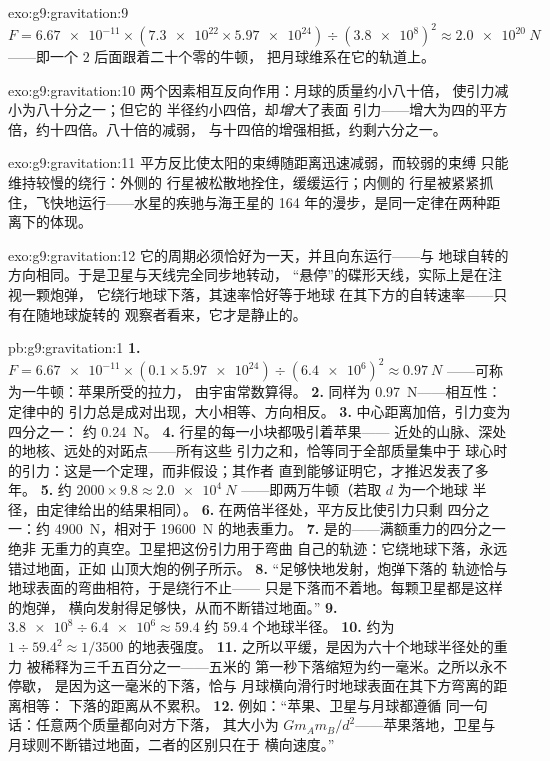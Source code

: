 \begin{solution}{exo:g9:gravitation:9}
$F = \num{6.67e-11} \times (\num{7.3e22} \times
\num{5.97e24}) \div (\num{3.8e8})^2 \approx \qty{2.0e20}{N}$
——即一个 $2$ 后面跟着二十个零的牛顿，
把月球维系在它的轨道上。
\end{solution}

\begin{solution}{exo:g9:gravitation:10}
两个因素相互反向作用：月球的质量约小八十倍，
使引力减小为八十分之一；但它的
半径约小四倍，却\emph{增大}了表面
引力——增大为四的平方倍，约十四倍。八十倍的减弱，
与十四倍的增强相抵，约剩六分之一。
\end{solution}

\begin{solution}{exo:g9:gravitation:11}
平方反比使太阳的束缚随距离迅速减弱，而较弱的束缚
只能维持较慢的绕行：外侧的
行星被松散地拴住，缓缓运行；内侧的
行星被紧紧抓住，飞快地运行——水星的疾驰与海王星的
164 年的漫步，是同一定律在两种距离下的体现。
\end{solution}

\begin{solution}{exo:g9:gravitation:12}
它的周期必须恰好为一天，并且向东运行——与
地球自转的方向相同。于是卫星与天线完全同步地转动，
“悬停”的碟形天线，实际上是在注视一颗炮弹，
它绕行地球下落，其速率恰好等于地球
在其下方的自转速率——只有在随地球旋转的
观察者看来，它才是静止的。
\end{solution}

\begin{solution}{pb:g9:gravitation:1}
\textbf{1.} $F = \num{6.67e-11} \times (0.1 \times
\num{5.97e24}) \div (\num{6.4e6})^2 \approx \qty{0.97}{N}$
——可称为一牛顿：苹果所受的拉力，
由宇宙常数算得。
\textbf{2.} 同样为 \qty{0.97}{N}——相互性：定律中的
引力总是成对出现，大小相等、方向相反。
\textbf{3.} 中心距离加倍，引力变为四分之一：
约 \qty{0.24}{N}。
\textbf{4.} 行星的每一小块都吸引着苹果——
近处的山脉、深处的地核、远处的对跖点——所有这些
引力之和，恰等同于全部质量集中于
球心时的引力：这是一个定理，而非假设；其作者
直到能够证明它，才推迟发表了多年。
\textbf{5.} 约 $2000 \times 9.8 \approx \qty{2.0e4}{N}$
——即两万牛顿（若取 $d$ 为一个地球
半径，由定律给出的结果相同）。
\textbf{6.} 在两倍半径处，平方反比使引力只剩
四分之一：约 \qty{4900}{N}，相对于 \qty{19600}{N}
的地表重力。
\textbf{7.} 是的——满额重力的四分之一绝非
无重力的真空。卫星把这份引力用于弯曲
自己的轨迹：它绕地球下落，永远错过地面，正如
山顶大炮的例子所示。
\textbf{8.} “足够快地发射，炮弹下落的
轨迹恰与地球表面的弯曲相符，于是绕行不止——
只是下落而不着地。每颗卫星都是这样的炮弹，
横向发射得足够快，从而不断错过地面。”
\textbf{9.} $\num{3.8e8} \div \num{6.4e6} \approx 59.4$
约 59.4 个地球半径。
\textbf{10.} 约为 $1 \div 59.4^2 \approx 1/3500$
的地表强度。
\textbf{11.} 之所以平缓，是因为六十个地球半径处的重力
被稀释为三千五百分之一——五米的
第一秒下落缩短为约一毫米。之所以永不停歇，
是因为这一毫米的下落，恰与
月球横向滑行时地球表面在其下方弯离的距离相等：
下落的距离从不累积。
\textbf{12.} 例如：“苹果、卫星与月球都遵循
同一句话：任意两个质量都向对方下落，
其大小为 $G m_A m_B / d^2$——苹果落地，卫星与
月球则不断错过地面，二者的区别只在于
横向速度。”
\end{solution}
